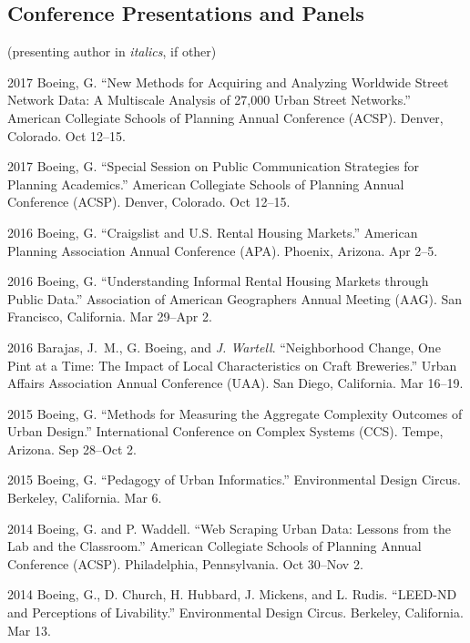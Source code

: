 \documentclass{academiccv}
\begin{document}
\subsection*{Conference Presentations and Panels}

(presenting author in \textit{italics}, if other)\bigskip

\begin{tablist}

\item[2017] \tab Boeing, G. \enquote{New Methods for Acquiring and Analyzing Worldwide Street Network Data: A Multiscale Analysis of 27,000 Urban Street Networks.} American Collegiate Schools of Planning Annual Conference (ACSP). Denver, Colorado. Oct 12--15.

\item[2017] \tab Boeing, G. \enquote{Special Session on Public Communication Strategies for Planning Academics.} American Collegiate Schools of Planning Annual Conference (ACSP). Denver, Colorado. Oct 12--15.

\item[2016] \tab Boeing, G. \enquote{Craigslist and U.S. Rental Housing Markets.} American Planning Association Annual Conference (APA). Phoenix, Arizona. Apr 2--5.

\item[2016] \tab Boeing, G. \enquote{Understanding Informal Rental Housing Markets through Public Data.} Association of American Geographers Annual Meeting (AAG). San Francisco, California. Mar 29--Apr 2.

\item[2016] \tab Barajas, J.~M., G. Boeing, and \textit{J. Wartell}. \enquote{Neighborhood Change, One Pint at a Time: The Impact of Local Characteristics on Craft Breweries.} Urban Affairs Association Annual Conference (UAA). San Diego, California. Mar 16--19.

\item[2015] \tab Boeing, G. \enquote{Methods for Measuring the Aggregate Complexity Outcomes of Urban Design.} International Conference on Complex Systems (CCS). Tempe, Arizona. Sep 28--Oct 2.

\item[2015] \tab Boeing, G. \enquote{Pedagogy of Urban Informatics.} Environmental Design Circus. Berkeley, California. Mar 6.

\item[2014] \tab Boeing, G. and P. Waddell. \enquote{Web Scraping Urban Data: Lessons from the Lab and the Classroom.} American Collegiate Schools of Planning Annual Conference (ACSP). Philadelphia, Pennsylvania. Oct 30--Nov 2.

\item[2014] \tab Boeing, G., D. Church, H. Hubbard, J. Mickens, and L. Rudis. \enquote{LEED-ND and Perceptions of Livability.} Environmental Design Circus. Berkeley, California. Mar 13.

\end{tablist}
\end{document}
